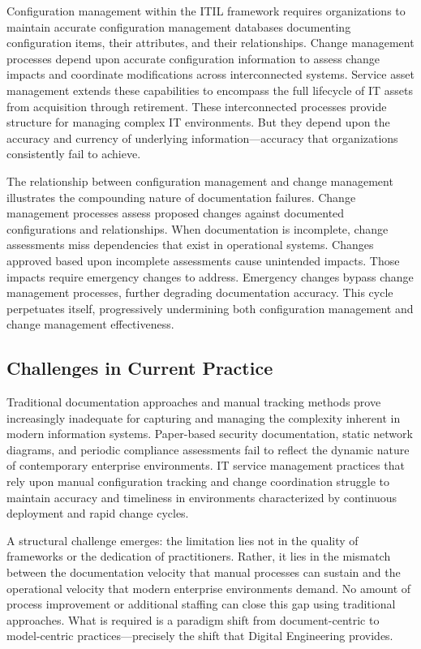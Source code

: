 Configuration management within the ITIL framework requires organizations to maintain accurate configuration management databases documenting configuration items, their attributes, and their relationships. Change management processes depend upon accurate configuration information to assess change impacts and coordinate modifications across interconnected systems. Service asset management extends these capabilities to encompass the full lifecycle of IT assets from acquisition through retirement. These interconnected processes provide structure for managing complex IT environments. But they depend upon the accuracy and currency of underlying information---accuracy that organizations consistently fail to achieve.

The relationship between configuration management and change management illustrates the compounding nature of documentation failures. Change management processes assess proposed changes against documented configurations and relationships. When documentation is incomplete, change assessments miss dependencies that exist in operational systems. Changes approved based upon incomplete assessments cause unintended impacts. Those impacts require emergency changes to address. Emergency changes bypass change management processes, further degrading documentation accuracy. This cycle perpetuates itself, progressively undermining both configuration management and change management effectiveness.

\subsection{Challenges in Current Practice}

Traditional documentation approaches and manual tracking methods prove increasingly inadequate for capturing and managing the complexity inherent in modern information systems. Paper-based security documentation, static network diagrams, and periodic compliance assessments fail to reflect the dynamic nature of contemporary enterprise environments. IT service management practices that rely upon manual configuration tracking and change coordination struggle to maintain accuracy and timeliness in environments characterized by continuous deployment and rapid change cycles.

A structural challenge emerges: the limitation lies not in the quality of frameworks or the dedication of practitioners. Rather, it lies in the mismatch between the documentation velocity that manual processes can sustain and the operational velocity that modern enterprise environments demand. No amount of process improvement or additional staffing can close this gap using traditional approaches. What is required is a paradigm shift from document-centric to model-centric practices---precisely the shift that Digital Engineering provides.

